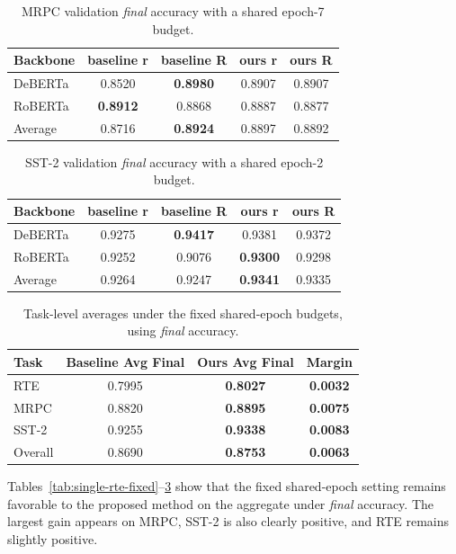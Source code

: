 \documentclass{article}
\begin{document}
\begin{table}[H]
\centering
\caption{MRPC validation \textit{final} accuracy with a shared epoch-7 budget.}
\label{tab:single-mrpc-fixed}
\small
\begin{tabular}{lcccc}
\toprule
\multirow{2}{*}{Backbone} & baseline r & baseline R & ours r & ours R \\
\midrule
DeBERTa & 0.8520 & \textbf{0.8980} & 0.8907 & 0.8907 \\
RoBERTa & \textbf{0.8912} & 0.8868 & 0.8887 & 0.8877 \\
Average & 0.8716 & \textbf{0.8924} & 0.8897 & 0.8892 \\
\bottomrule
\end{tabular}
\end{table}

\begin{table}[H]
\centering
\caption{SST-2 validation \textit{final} accuracy with a shared epoch-2 budget.}
\label{tab:single-sst2-fixed}
\small
\begin{tabular}{lcccc}
\toprule
\multirow{2}{*}{Backbone} & baseline r & baseline R & ours r & ours R \\
\midrule
DeBERTa & 0.9275 & \textbf{0.9417} & 0.9381 & 0.9372 \\
RoBERTa & 0.9252 & 0.9076 & \textbf{0.9300} & 0.9298 \\
Average & 0.9264 & 0.9247 & \textbf{0.9341} & 0.9335 \\
\bottomrule
\end{tabular}
\end{table}

\begin{table}[H]
\centering
\caption{Task-level averages under the fixed shared-epoch budgets, using
\textit{final} accuracy.}
\label{tab:single-overall-fixed}
\begin{tabular}{lccc}
\toprule
Task & Baseline Avg Final & Ours Avg Final & Margin \\
\midrule
RTE & 0.7995 & \textbf{0.8027} & \textbf{0.0032} \\
MRPC & 0.8820 & \textbf{0.8895} & \textbf{0.0075} \\
SST-2 & 0.9255 & \textbf{0.9338} & \textbf{0.0083} \\
Overall & 0.8690 & \textbf{0.8753} & \textbf{0.0063} \\
\bottomrule
\end{tabular}
\end{table}

Tables~\ref{tab:single-rte-fixed}--\ref{tab:single-overall-fixed} show that
the fixed shared-epoch setting remains favorable to the proposed method on the
aggregate under \textit{final} accuracy. The largest gain appears on MRPC,
SST-2 is also clearly positive, and RTE remains slightly positive.
\end{document}
